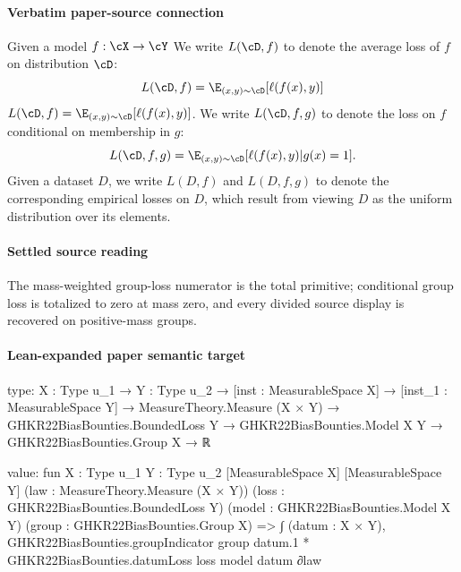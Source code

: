 \documentclass[10pt]{article}
\begin{document}
\paragraph{Verbatim paper-source connection}
\begin{ReviewVerbatim}
\begin{definition}
Given a model $f:\cX\rightarrow \cY$
We write $L(\cD,f)$ to denote the average loss of $f$ on distribution $\cD$:
\ifdraft
$$L(\cD,f) = \E_{(x,y) \sim \cD}[\ell(f(x),y)]$$
\else $L(\cD,f) = \E_{(x,y) \sim \cD}[\ell(f(x),y)]$. \fi
We  write $L(\cD,f,g)$ to denote the loss on $f$ conditional on membership in $g$:
$$L(\cD,f,g) = \E_{(x,y) \sim \cD}[\ell(f(x),y) | g(x) = 1].$$
Given a dataset $D$, we write $L(D,f)$ and $L(D,f,g)$ to denote the corresponding empirical losses on $D$, which result from viewing $D$ as the uniform distribution over its elements.
\end{definition}
\end{ReviewVerbatim}

\paragraph{Settled source reading}
The mass-\allowbreak{}weighted group-\allowbreak{}loss numerator is the total primitive;\allowbreak{} conditional group loss is totalized to zero at mass zero, and every divided source display is recovered on positive-\allowbreak{}mass groups.\allowbreak{}

\paragraph{Lean-expanded paper semantic target}
\begin{ReviewVerbatim}
type:
{X : Type u_1} →
  {Y : Type u_2} →
    [inst : MeasurableSpace X] →
      [inst_1 : MeasurableSpace Y] →
        MeasureTheory.Measure (X × Y) →
          GHKR22BiasBounties.BoundedLoss Y → GHKR22BiasBounties.Model X Y → GHKR22BiasBounties.Group X → ℝ

value:
fun {X : Type u_1} {Y : Type u_2} [MeasurableSpace X] [MeasurableSpace Y] (law : MeasureTheory.Measure (X × Y))
    (loss : GHKR22BiasBounties.BoundedLoss Y) (model : GHKR22BiasBounties.Model X Y)
    (group : GHKR22BiasBounties.Group X) =>
  ∫ (datum : X × Y),
    GHKR22BiasBounties.groupIndicator group datum.1 * GHKR22BiasBounties.datumLoss loss model datum ∂law
\end{ReviewVerbatim}
\end{document}
